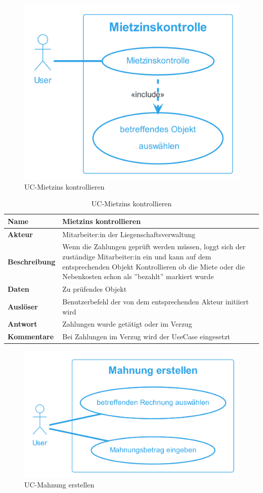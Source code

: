 \begin{figure}[H]
  \begin{center}
    \includegraphics[width=0.4\linewidth]{content/diagrams/out/usecase/mietzinsKontrollieren/MietzinsKontrollieren.png}
    \caption{UC-Mietzins kontrollieren}
    \label{MietzinsKontrollieren}
  \end{center}
\end{figure}

\vspace*{-0.8cm}
\begin{table}[H]
  \centering
  \settowidth{}
  \setlength\extrarowheight{2pt}
  \begin{tabulary}{1.0\textwidth}{|a|m{14cm}|}
    \hline
    \textbf{Name}& Mietzins kontrollieren\\
    \hline
    \textbf{Akteur}& Mitarbeiter:in der Liegenschaftsverwaltung\\
    \hline 
    \textbf{Beschreibung} & Wenn die Zahlungen geprüft werden müssen, loggt sich der zuständige Mitarbeiter:in ein und kann auf dem entsprechenden Objekt Kontrollieren ob die Miete oder die Nebenkosten schon als ''bezahlt'' markiert wurde\\
    \hline
    \textbf{Daten} & Zu prüfendes Objekt\\
    \hline
    \textbf{Auslöser} & Benutzerbefehl der von dem entsprechenden Akteur initiiert wird\\
    \hline
    \textbf{Antwort} & Zahlungen wurde getätigt oder im Verzug\\
    \hline
    \textbf{Kommentare} & Bei Zahlungen im Verzug wird der UseCase  eingesetzt\\
    \hline
  \end{tabulary}
  \caption{UC-Mietzins kontrollieren}
\end{table}

\vspace*{-0.8cm}

\begin{figure}[H]
  \begin{center}
    \includegraphics[width=0.5\linewidth]{content/diagrams/out/usecase/mahnungGenerieren/MahnungErstellen.png}
    \caption{UC-Mahnung erstellen}
    \label{mahnung}
  \end{center}
\end{figure}

